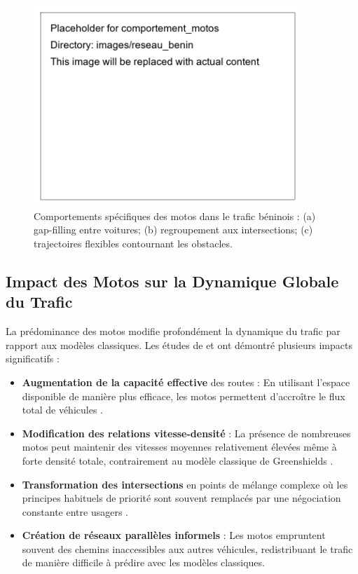 \begin{figure}[htbp]
\centering
\includegraphics[width=0.9\textwidth]{images/reseau_benin/comportement_motos}
\caption{Comportements spécifiques des motos dans le trafic béninois : (a) gap-filling entre voitures; (b) regroupement aux intersections; (c) trajectoires flexibles contournant les obstacles.}
\label{fig:comportement_motos}
\end{figure}

\subsection{Impact des Motos sur la Dynamique Globale du Trafic}
\label{subsec:impact_motos}

La prédominance des motos modifie profondément la dynamique du trafic par rapport aux modèles classiques. Les études de \cite{wong2002multi} et \cite{fan2013heterogeneous} ont démontré plusieurs impacts significatifs :

\begin{itemize}
\item \textbf{Augmentation de la capacité effective} des routes : En utilisant l'espace disponible de manière plus efficace, les motos permettent d'accroître le flux total de véhicules \cite{chanut2005modeles}.

\item \textbf{Modification des relations vitesse-densité} : La présence de nombreuses motos peut maintenir des vitesses moyennes relativement élevées même à forte densité totale, contrairement au modèle classique de Greenshields \cite{greenshields1935study}.

\item \textbf{Transformation des intersections} en points de mélange complexe où les principes habituels de priorité sont souvent remplacés par une négociation constante entre usagers \cite{akcelik2003relationship}.

\item \textbf{Création de réseaux parallèles informels} : Les motos empruntent souvent des chemins inaccessibles aux autres véhicules, redistribuant le trafic de manière difficile à prédire avec les modèles classiques.
\end{itemize}

